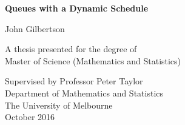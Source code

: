 \begin{titlepage}
    \begin{center}
        \vspace*{1cm}
        
        \Huge
        \textbf{Queues with a Dynamic Schedule}
        
        \vspace{0.5cm}
        
        \LARGE
        John Gilbertson
        
        \vfill
        
        A thesis presented for the degree of\\
        Master of Science (Mathematics and Statistics)
        
        \vspace{0.8cm}
        
        \Large
        Supervised by Professor Peter Taylor\\
        Department of Mathematics and Statistics\\
        The University of Melbourne\\
        October 2016
        
    \end{center}
\end{titlepage}














































